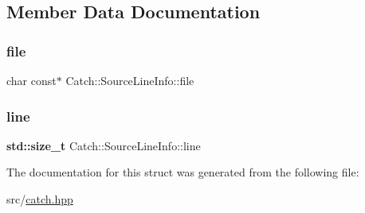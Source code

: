 \subsection{Member Data Documentation}
\mbox{\label{struct_catch_1_1_source_line_info_ad65537703e9f08c1fa7777fbc3f0c617}} 
\subsubsection{\texorpdfstring{file}{file}}
{\footnotesize\ttfamily char const$\ast$ Catch\+::\+Source\+Line\+Info\+::file}

\mbox{\label{struct_catch_1_1_source_line_info_a841e5d696c7b9cde24e45e61dd979c77}} 
\subsubsection{\texorpdfstring{line}{line}}
{\footnotesize\ttfamily \textbf{ std\+::size\+\_\+t} Catch\+::\+Source\+Line\+Info\+::line}



The documentation for this struct was generated from the following file\+:\begin{DoxyCompactItemize}
\item 
src/\hyperlink{catch_8hpp}{catch.\+hpp}\end{DoxyCompactItemize}
